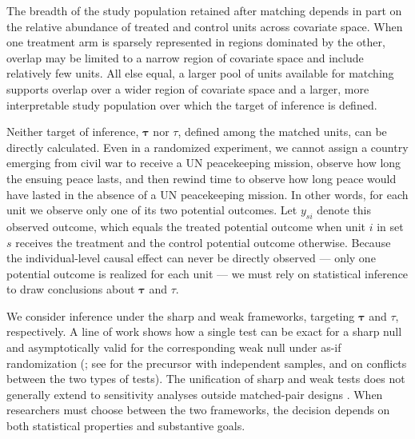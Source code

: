 \documentclass[
  12pt,
  leqno]{article}
\begin{document}
The breadth of the study population retained after matching depends in
part on the relative abundance of treated and control units across
covariate space. When one treatment arm is sparsely represented in
regions dominated by the other, overlap may be limited to a narrow
region of covariate space and include relatively few units. All else
equal, a larger pool of units available for matching supports overlap
over a wider region of covariate space and a larger, more interpretable
study population over which the target of inference is defined.

Neither target of inference, \(\bm{\tau}\) nor \(\tau\), defined among
the matched units, can be directly calculated. Even in a randomized
experiment, we cannot assign a country emerging from civil war to
receive a UN peacekeeping mission, observe how long the ensuing peace
lasts, and then rewind time to observe how long peace would have lasted
in the absence of a UN peacekeeping mission. In other words, for each
unit we observe only one of its two potential outcomes. Let \(y_{si}\)
denote this observed outcome, which equals the treated potential outcome
when unit \(i\) in set \(s\) receives the treatment and the control
potential outcome otherwise. Because the individual-level causal effect
can never be directly observed --- only one potential outcome is
realized for each unit --- we must rely on statistical inference to draw
conclusions about \(\bm{\tau}\) and \(\tau\).

We consider inference under the sharp and weak frameworks, targeting
\(\bm{\tau}\) and \(\tau\), respectively. A line of work shows how a
single test can be exact for a sharp null and asymptotically valid for
the corresponding weak null under as-if randomization
(\citealp{wuding2021, cohenfogarty2022, fogarty2023}; see
\citealp{chungromano2013} for the precursor with independent samples,
and \citealp{ding2017} on conflicts between the two types of tests). The
unification of sharp and weak tests does not generally extend to
sensitivity analyses outside matched-pair designs
\citep[see][]{fogarty2020, fogarty2023}. When researchers must choose
between the two frameworks, the decision depends on both statistical
properties and substantive goals.
\end{document}
